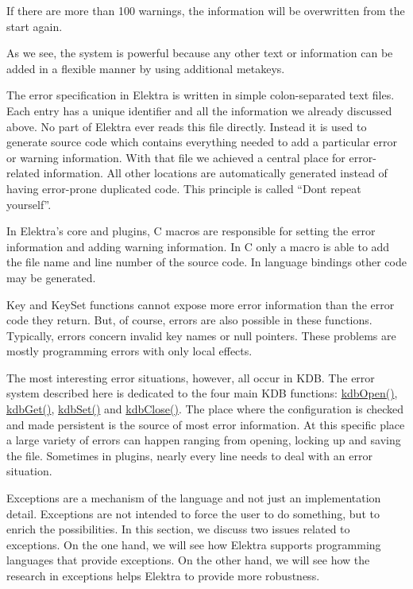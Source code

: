 If there are more than 100 warnings, the information will be overwritten from the start again.

As we see, the system is powerful because any other text or information can be added in a flexible manner by using additional metakeys.

The error specification in Elektra is written in simple colon-\/separated text files. Each entry has a unique identifier and all the information we already discussed above. No part of Elektra ever reads this file directly. Instead it is used to generate source code which contains everything needed to add a particular error or warning information. With that file we achieved a central place for error-\/related information. All other locations are automatically generated instead of having error-\/prone duplicated code. This principle is called “\+Don\textquotesingle{}t repeat yourself”.

In Elektra’s core and plugins, C macros are responsible for setting the error information and adding warning information. In C only a macro is able to add the file name and line number of the source code. In language bindings other code may be generated.

{\ttfamily Key} and {\ttfamily Key\+Set} functions cannot expose more error information than the error code they return. But, of course, errors are also possible in these functions. Typically, errors concern invalid key names or null pointers. These problems are mostly programming errors with only local effects.

The most interesting error situations, however, all occur in {\ttfamily K\+DB}. The error system described here is dedicated to the four main {\ttfamily K\+DB} functions\+: {\ttfamily \mbox{\hyperlink{group__kdb_ga6808defe5870f328dd17910aacbdc6ca}{kdb\+Open()}}}, {\ttfamily \mbox{\hyperlink{group__kdb_ga28e385fd9cb7ccfe0b2f1ed2f62453a1}{kdb\+Get()}}}, {\ttfamily \mbox{\hyperlink{group__kdb_ga11436b058408f83d303ca5e996832bcf}{kdb\+Set()}}} and {\ttfamily \mbox{\hyperlink{group__kdb_gadb54dc9fda17ee07deb9444df745c96f}{kdb\+Close()}}}. The place where the configuration is checked and made persistent is the source of most error information. At this specific place a large variety of errors can happen ranging from opening, locking up and saving the file. Sometimes in plugins, nearly every line needs to deal with an error situation.

Exceptions are a mechanism of the language and not just an implementation detail. Exceptions are not intended to force the user to do something, but to enrich the possibilities. In this section, we discuss two issues related to exceptions. On the one hand, we will see how Elektra supports programming languages that provide exceptions. On the other hand, we will see how the research in exceptions helps Elektra to provide more robustness.

